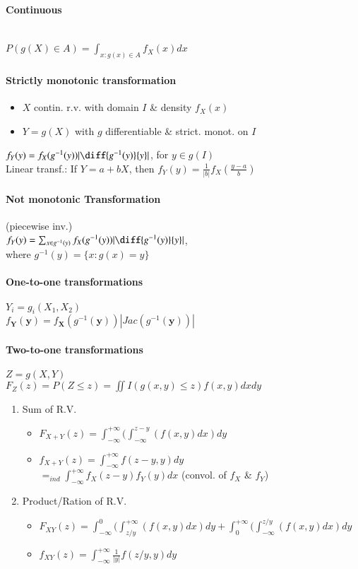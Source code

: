 \documentclass[paper=a4,fontsize=8pt,pagesize,DIV=calc]{scrartcl}
\begin{document}
\begin{multicols}{3}
\paragraph{Continuous}~~\\ $P(g(X)\in A)=\int_{x:g(x)\in A} f_X(x)dx$\\
\paragraph{Strictly monotonic transformation}
\begin{itemize}
\item $X$ contin. r.v. with domain $I$ \& density $f_X(x)$
\item $Y=g(X)$ with $g$ differentiable  \& strict. monot. on $I$
\end{itemize}
$f_Y(y)=f_X(g^{-1}(y))|\diff{g^{-1}(y)}{y}| $, for $ y \in g(I)$\\
Linear transf.: If $Y=a+bX$, then $f_Y(y)=\frac{1}{|b|}f_X \left( \frac{y-a}{b}\right)$
\paragraph{Not monotonic Transformation} (piecewise inv.) ~~\\
$f_Y(y)=\sum_{x\in g^{-1}(y)} f_X(g^{-1}(y))|\diff{g^{-1}(y)}{y}| $,\\
where $ g^{-1}(y)= \{x:g(x)=y\}$
\paragraph{One-to-one transformations} $Y_i=g_i(X_1,X_2)$\\
$f_\textbf{Y}(\textbf{y})=f_\textbf{X}(g^{-1}(\textbf{y}))|Jac(g^{-1}(\textbf{y}))|$
\paragraph{Two-to-one transformations} $Z=g(X,Y)$\\
$F_Z(z)=P(Z\leq z)= \iint I(g(x,y)\leq z)f(x,y)dxdy$
\begin{enumerate}
\item Sum of R.V.
\begin{itemize}
\item $F_{X+Y}(z)=\int^{+\infty}_{-\infty}(\int^{z-y}_{-\infty}(f(x,y)dx)dy$
\item $f_{X+Y}(z)=\int^{+\infty}_{-\infty}f(z-y,y)dy$\\$=_{ind}\int^{+\infty}_{-\infty}f_X(z-y)f_Y(y)dx$ (convol. of $f_X$ \& $f_Y$)
\end{itemize}
\item Product/Ration of R.V.
\begin{itemize}
\item $F_{XY}(z)=\int^{0}_{-\infty}(\int^{+\infty}_{z/y}(f(x,y)dx)dy+\int^{+\infty}_{0}(\int^{z/y}_{-\infty}(f(x,y)dx)dy$
\item $f_{XY}(z)=\int^{+\infty}_{-\infty}\frac{1}{|y|}f(z/y,y)dy$
\end{itemize}
\end{enumerate}

\end{multicols}
\end{document}
